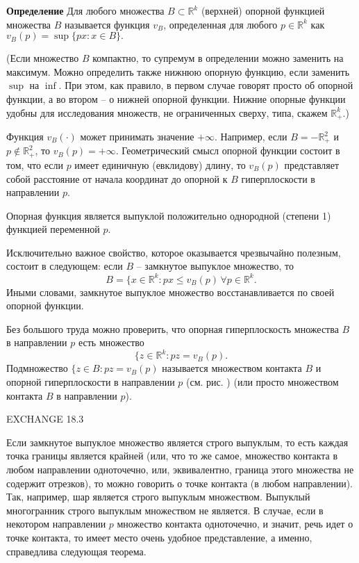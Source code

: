 \textbf{Определение} Для любого множества $B\subset\mathbb{R}^k$ (верхней) опорной
функцией множества $B$ называется функция $v_B$, определенная для
любого $p\in\mathbb{R}^k$ как
$v_B(p)=\sup\{px: x\in B\}.$

(Если множество $B$ компактно, то супремум в определении можно заменить на
максимум. Можно определить также нижнюю опорную функцию, если заменить $\sup$
на $\inf$. При этом, как правило, в первом случае говорят просто об опорной функции, а
во втором -- о нижней опорной функции. Нижние опорные функции удобны для
исследования множеств, не ограниченных сверху, типа, скажем $\mathbb{R}^k_+$.)

Функция $v_B(\cdot)$ может принимать значение $+\infty$. Например, если $B=-\mathbb{R}^2_+$ и
$p\notin\mathbb{R}^2_+$, то $v_B(p)=+\infty$. Геометрический смысл опорной функции
состоит в том, что если $p$ имеет единичную (евклидову) длину, то
$v_B(p)$ представляет собой расстояние от начала координат до опорной к
$B$ гиперплоскости в направлении $p$.

Опорная функция является выпуклой положительно однородной (степени 1) функцией переменной $p$.

Исключительно важное свойство, которое оказывается чрезвычайно полезным, состоит в следующем:
если $B$ -- замкнутое выпуклое множество, то
$$B=\{x\in\mathbb{R}^k: px\leq v_B(p)\, \forall p\in\mathbb{R}^k.$$
Иными словами, замкнутое выпуклое множество восстанавливается по своей опорной функции.

Без большого труда можно проверить, что опорная гиперплоскость множества $B$ в направлении
$p$ есть множество
$$\{z\in\mathbb{R}^k: pz=v_B(p).$$
Подмножество $\{z\in B: pz=v_B(p)$ называется множеством контакта $B$ и опорной гиперплоскости
в направлении $p$ (см. рис.   ) (или просто множеством контакта $B$ в направлении $p$).

EXCHANGE 18.3

Если замкнутое выпуклое множество является строго выпуклым, то есть каждая точка границы является
крайней (или, что то же самое, множество контакта в любом направлении одноточечно, или, эквивалентно,
граница этого множества не содержит отрезков), то можно говорить о точке контакта (в любом направлении).
Так, например, шар является строго выпуклым множеством. Выпуклый многогранник строго выпуклым
множеством не является. В случае, если в некотором направлении $p$ множество контакта одноточечно,
и значит, речь идет о точке контакта, то имеет место очень удобное представление, а именно, справедлива
следующая теорема.

